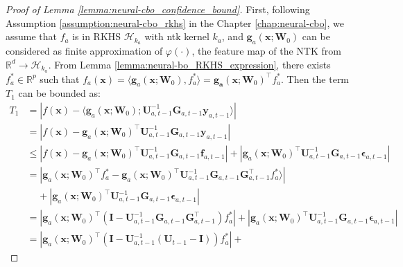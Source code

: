 \begin{proof}[Proof of Lemma \ref{lemma:neural-cbo_confidence_bound}]
First, following Assumption \ref{assumption:neural-cbo_rkhs} in the Chapter \ref{chap:neural-cbo}, we assume that $f_a$ is in RKHS $\mathcal{H}_{k_a}$ with \ac{ntk} kernel $k_a$, and $\mathbf{g}_a(\mathbf{x}; \mathbf{W}_0)$  can be considered as finite approximation of $\varphi(\cdot)$, the feature map of the NTK from $\mathbb{R}^d \rightarrow \mathcal{H}_{k_a}$. From Lemma \ref{lemma:neural-bo_RKHS_expression}, there exists $f_a^* \in \mathbb{R}^p$ such that $f_a(\mathbf{x}) = \langle \mathbf{g}_a(\mathbf{x}; \mathbf{W}_0), f_a^* \rangle = \mathbf{g_a}(\mathbf{x}; \mathbf{W}_0)^\top f_a^*$. 
Then the term $T_1$ can be bounded as:
\begin{align*}
\label{ieqn:neural_cbo_confidence_interval}
         T_1 &= \left \lvert f(\mathbf{x}) - \langle \mathbf{g}_a(\mathbf{x}; \mathbf{W}_0); \mathbf{U}^{-1}_{a,t-1} \mathbf{G}_{a,t-1} \mathbf{y}_{a,t-1} \rangle   \right \rvert  
         \\
         & = \left\lvert f(\mathbf{x}) - \mathbf{g}_a(\mathbf{x}; \mathbf{W}_0)^\top  \mathbf{U}^{-1}_{a,t-1} \mathbf{G}_{a,t-1} \mathbf{y}_{a,t-1} \right\rvert 
         \\
        & \leq \left\lvert f(\mathbf{x}) - \mathbf{g}_a(\mathbf{x}; \mathbf{W}_0)^\top  \mathbf{U}^{-1}_{a,t-1}
        \mathbf{G}_{a,t-1}\mathbf{f}_{a, t-1} \right\rvert + 
        \left\lvert \mathbf{g}_a(\mathbf{x}; \mathbf{W}_0)^\top \mathbf{U}^{-1}_{a,t-1}
        \mathbf{G}_{a,t-1} \boldsymbol{\epsilon}_{a, t-1} \right\rvert
        \\
        & = \left\lvert \mathbf{g}_a(\mathbf{x}; \mathbf{W}_0)^\top f_a^* - \mathbf{g}_a(\mathbf{x}; \mathbf{W}_0)^\top  \mathbf{U}^{-1}_{a,t-1} 
        \mathbf{G}_{a,t-1}
        \mathbf{G}_{a,t-1}^\top f_a^* \rangle \right\rvert \\
        & \;\;\;\; + 
        \left\rvert  \mathbf{g}_a(\mathbf{x}; \mathbf{W}_0)^\top \mathbf{U}^{-1}_{a,t-1} \mathbf{G}_{a,t-1} \boldsymbol{\epsilon}_{a, t-1}  \right\rvert
        \\
        & = \left\lvert \mathbf{g}_a(\mathbf{x}; \mathbf{W}_0)^\top \left( \mathbf{I} -  \mathbf{U}^{-1}_{a,t-1}  \mathbf{G}_{a,t-1} \mathbf{G}_{a,t-1}^\top  \right) f_a^*  \right \vert + 
        \left\lvert  \mathbf{g}_a(\mathbf{x}; \mathbf{W}_0)^\top \mathbf{U}^{-1}_{a,t-1} \mathbf{G}_{a,t-1} \boldsymbol{\epsilon}_{a, t-1}  \right\rvert 
        \\
        & = \left\lvert \mathbf{g}_a(\mathbf{x}; \mathbf{W}_0)^\top \left( \mathbf{I} -  \mathbf{U}^{-1}_{a,t-1} \left( \mathbf{U}_{t-1} - \mathbf{I} \right)  \right) f_a^*  \right \vert +

\end{align*}
\end{proof}
